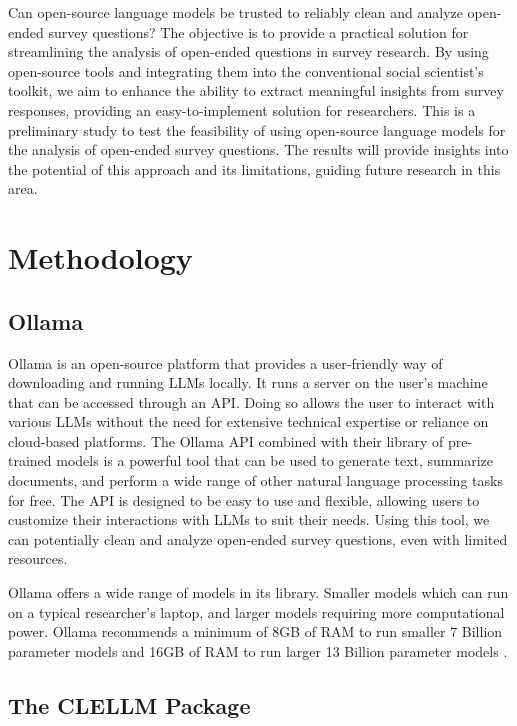 \documentclass[
  authoryear,
  preprint,
  3p]{elsarticle}
\begin{document}
Can open-source language models be trusted to reliably clean and analyze
open-ended survey questions? The objective is to provide a practical
solution for streamlining the analysis of open-ended questions in survey
research. By using open-source tools and integrating them into the
conventional social scientist's toolkit, we aim to enhance the ability
to extract meaningful insights from survey responses, providing an
easy-to-implement solution for researchers. This is a preliminary study
to test the feasibility of using open-source language models for the
analysis of open-ended survey questions. The results will provide
insights into the potential of this approach and its limitations,
guiding future research in this area.

\section{Methodology}\label{methodology}

\subsection{Ollama}\label{ollama}

Ollama is an open-source platform that provides a user-friendly way of
downloading and running LLMs locally. It runs a server on the user's
machine that can be accessed through an API. Doing so allows the user to
interact with various LLMs without the need for extensive technical
expertise or reliance on cloud-based platforms. The Ollama API combined
with their library of pre-trained models is a powerful tool that can be
used to generate text, summarize documents, and perform a wide range of
other natural language processing tasks for free. The API is designed to
be easy to use and flexible, allowing users to customize their
interactions with LLMs to suit their needs. Using this tool, we can
potentially clean and analyze open-ended survey questions, even with
limited resources.

Ollama offers a wide range of models in its library. Smaller models
which can run on a typical researcher's laptop, and larger models
requiring more computational power. Ollama recommends a minimum of 8GB
of RAM to run smaller 7 Billion parameter models and 16GB of RAM to run
larger 13 Billion parameter models \citep{ollama24}.

\subsection{The CLELLM Package}\label{the-clellm-package}
\end{document}

